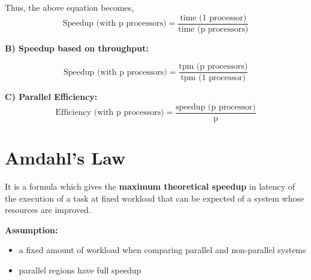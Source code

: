 \documentclass[12pt, a4paper]{report}
\begin{document}
Thus, the above equation becomes,
\begin{equation*}
    \textrm{Speedup (with p processors)} = \frac{\textrm{time (1 processor)}}{\textrm{time (p processors)}}
\end{equation*}

{\bfseries B) Speedup based on throughput:}

\vspace{0.1cm}
{\small{}}
\begin{equation*}
    \textrm{Speedup (with p processors)} = \frac{\textrm{tpm (p processors)}}{\textrm{tpm (1 processor)}}
\end{equation*}

{\bfseries C) Parallel Efficiency:}
\begin{equation*}
    \textrm{Efficiency (with p processors)} = \frac{\textrm{speedup (p processor)}}{\textrm{p}}
\end{equation*}

\section{Amdahl's Law}
It is a formula which gives the {\bfseries maximum theoretical speedup} in latency of the execution of a task 
at fixed workload that can be expected of a system whose resources are improved. 

{\bfseries Assumption:}
\begin{itemize}
    \item a fixed amount of workload when comparing parallel and non-parallel systems
    \item parallel regions have full speedup
\end{itemize} 
\end{document}
